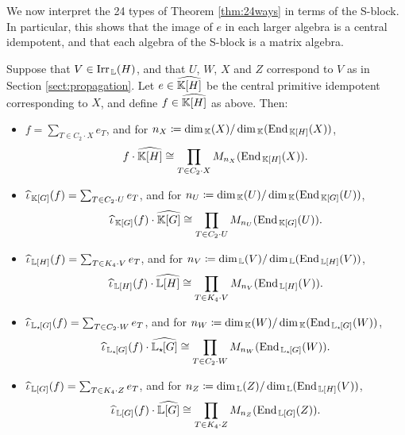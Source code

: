 We now interpret the 24 types of Theorem \ref{thm:24ways} in terms of the S-block. In particular, this shows that the image of $e$ in each larger algebra is a central idempotent, and that each algebra of the S-block is a matrix algebra.

\begin{prop}\label{prop:descofSblock}
    Suppose that $V \in \operatorname{Irr}_{\, {\mathbb L}}(H)$, and that $U$, $W$, $X$ and $Z$ correspond to $V$ as in Section \ref{sect:propagation}. Let $e \in \widehat{{\mathbb K}[H]}$ be the central primitive idempotent corresponding to $X$, and define $f \in \widehat{{\mathbb K}[H]}$ as above. Then:
    \begin{itemize}
        \item $f = \sum_{T \in C_2 \cdot X} e_T$, and for $n_X \coloneqq \dim_{\, {\mathbb K}}(X) / \dim_{\, {\mathbb K}}(\operatorname{End}_{\, {\mathbb K}[H]}(X))$,
        \[
            f \cdot \widehat{{\mathbb K}[H]} \cong \prod_{T \in C_2 \cdot X} M_{n_X}(\operatorname{End}_{\, {\mathbb K}[H]}(X)).
        \]
        \item $\widehat{\iota}_{\, {\mathbb K}[G]}(f) = \sum_{T \in C_2 \cdot U} e_T$, and for $n_U \coloneqq \dim_{\, {\mathbb K}}(U) / \dim_{\, {\mathbb K}}(\operatorname{End}_{\, {\mathbb K}[G]}(U))$,
        \[
            \widehat{\iota}_{\, {\mathbb K}[G]}(f) \cdot \widehat{{\mathbb K}[G]} \cong \prod_{T \in C_2 \cdot U} M_{n_U}(\operatorname{End}_{\, {\mathbb K}[G]}(U)).
        \]
        \item $\widehat{\iota}_{\, {\mathbb L}[H]}(f) = \sum_{T \in K_4 \cdot V} e_T$, and for $n_V \coloneqq \dim_{\, {\mathbb L}}(V) / \dim_{\, {\mathbb L}}(\operatorname{End}_{\, {\mathbb L}[H]}(V))$,
        \[
            \widehat{\iota}_{\, {\mathbb L}[H]}(f) \cdot \widehat{{\mathbb L}[H]} \cong \prod_{T \in K_4 \cdot V} M_{n_V}(\operatorname{End}_{\, {\mathbb L}[H]}(V)).
        \]
        \item $\widehat{\iota}_{\, {\mathbb L}_{\star \hspace{-0.1em}}[G]}(f) = \sum_{T \in C_2 \cdot W} e_T$, and for $n_W \coloneqq \dim_{\, {\mathbb K}}(W) / \dim_{\, {\mathbb K}}(\operatorname{End}_{\, {\mathbb L}_{\star \hspace{-0.1em}}[G]}(W))$,
        \[
            \widehat{\iota}_{\, {\mathbb L}_{\star \hspace{-0.1em}}[G]}(f) \cdot \widehat{{\mathbb L}_{\star \hspace{-0.1em}}[G]} \cong \prod_{T \in C_2 \cdot W} M_{n_W}(\operatorname{End}_{\, {\mathbb L}_{\star \hspace{-0.1em}}[G]}(W)).
        \]
        \item $\widehat{\iota}_{\, {\mathbb L}[G]}(f) = \sum_{T \in K_4 \cdot Z} e_T$, and for $n_Z \coloneqq \dim_{\, {\mathbb L}}(Z) / \dim_{\, {\mathbb L}}(\operatorname{End}_{\, {\mathbb L}[H]}(V))$,
        \[
            \widehat{\iota}_{\, {\mathbb L}[G]}(f) \cdot \widehat{{\mathbb L}[G]} \cong \prod_{T \in K_4 \cdot Z} M_{n_Z}(\operatorname{End}_{\, {\mathbb L}[G]}(Z)).
        \]
    \end{itemize}
\end{prop}

